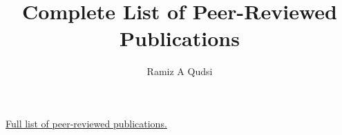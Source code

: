 \documentclass[letter,12pt]{article}
\begin{document}
\title{Complete List of Peer-Reviewed Publications}
\author{Ramiz A Qudsi}

\maketitle

\nocite{*}

\begingroup
\renewcommand{\section}[2]{}%
\endgroup

\vspace{4.0ex}
\hspace{1.8em} \href{https://ui.adsabs.harvard.edu/search/fq=%7B!type%3Daqp%20v%3D%24fq_author%7D&fq_author=(author_facet_hier%3A%221%2FQudsi%2C%20R%2FQudsi%2C%20R%20%20A%22%20OR%20author_facet_hier%3A%221%2FQudsi%2C%20R%2FQudsi%2C%20R%22%20OR%20author_facet_hier%3A%221%2FQudsi%2C%20R%2FQudsi%2C%20Ramiz%20A%22%20OR%20author_facet_hier%3A%221%2FQudsi%2C%20R%2FQudsi%2C%20Ramiz%20Ahmad%22)&q=Ramiz%20Qudsi&sort=date%20desc%2C%20bibcode%20desc&p_=0}{Full list of peer-reviewed publications.}\\
\end{document}
